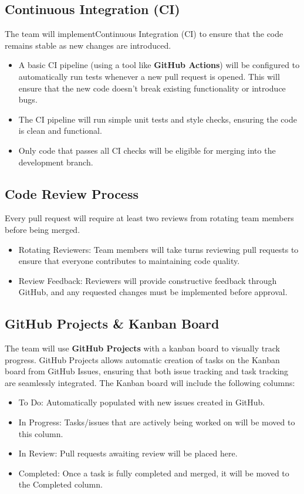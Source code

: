 \documentclass{article}
\begin{document}
\subsection{Continuous Integration (CI)}
The team will implementContinuous Integration (CI) to ensure that the code remains stable as new changes are introduced.
\begin{itemize}
    \item A basic CI pipeline (using a tool like \textbf{GitHub Actions}) will be configured to automatically run tests whenever a new pull request is opened. This will ensure that the new code doesn’t break existing functionality or introduce bugs.
    \item The CI pipeline will run simple unit tests and style checks, ensuring the code is clean and functional.
    \item Only code that passes all CI checks will be eligible for merging into the development branch.
\end{itemize}

\subsection{Code Review Process}
Every pull request will require at least two reviews from rotating team members before being merged.
\begin{itemize}
    \item Rotating Reviewers: Team members will take turns reviewing pull requests to ensure that everyone contributes to maintaining code quality.
    \item Review Feedback: Reviewers will provide constructive feedback through GitHub, and any requested changes must be implemented before approval.
\end{itemize}

\subsection{GitHub Projects \& Kanban Board}
The team will use \textbf{GitHub Projects} with a kanban board to visually track progress. GitHub Projects allows automatic creation of tasks on the Kanban board from GitHub Issues, ensuring that both issue tracking and task tracking are seamlessly integrated. The Kanban board will include the following columns:
\begin{itemize}
    \item To Do: Automatically populated with new issues created in GitHub.
    \item In Progress: Tasks/issues that are actively being worked on will be moved to this column.
    \item In Review: Pull requests awaiting review will be placed here.
    \item Completed: Once a task is fully completed and merged, it will be moved to the Completed column.
\end{itemize}
\end{document}
